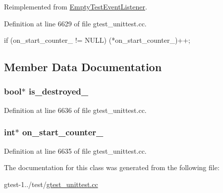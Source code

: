 \-Reimplemented from \hyperlink{classtesting_1_1EmptyTestEventListener_a9d43d6e5c4c37ade824998de2d83bd20}{\-Empty\-Test\-Event\-Listener}.



\-Definition at line 6629 of file gtest\-\_\-unittest.\-cc.


\begin{DoxyCode}
                                                     {
    if (on_start_counter_ != NULL)
      (*on_start_counter_)++;
  }
\end{DoxyCode}


\subsection{\-Member \-Data \-Documentation}
\hypertarget{classTestListener_a77af937493a52de2449bc2701314c146}{
\subsubsection[{is\-\_\-destroyed\-\_\-}]{\setlength{\rightskip}{0pt plus 5cm}bool$\ast$ {\bf is\-\_\-destroyed\-\_\-}}}\label{d4/d81/classTestListener_a77af937493a52de2449bc2701314c146}


\-Definition at line 6636 of file gtest\-\_\-unittest.\-cc.

\hypertarget{classTestListener_a6cec3b3ede5f422fc838ea5729c7fa8d}{
\subsubsection[{on\-\_\-start\-\_\-counter\-\_\-}]{\setlength{\rightskip}{0pt plus 5cm}int$\ast$ {\bf on\-\_\-start\-\_\-counter\-\_\-}}}\label{d4/d81/classTestListener_a6cec3b3ede5f422fc838ea5729c7fa8d}


\-Definition at line 6635 of file gtest\-\_\-unittest.\-cc.



\-The documentation for this class was generated from the following file\-:\begin{DoxyCompactItemize}
\item 
gtest-\/1../test/\hyperlink{gtest__unittest_8cc}{gtest\-\_\-unittest.\-cc}\end{DoxyCompactItemize}
